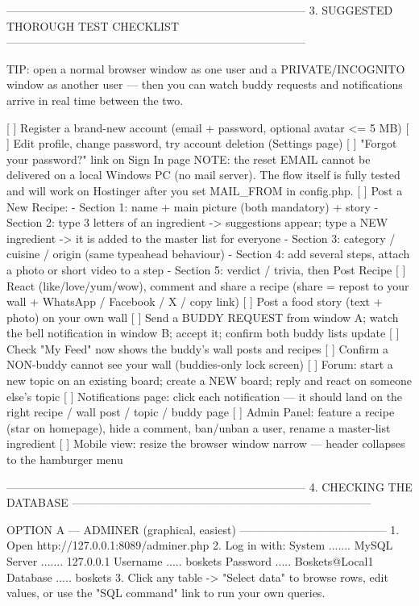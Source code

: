 --------------------------------------------------------------------------------
 3. SUGGESTED THOROUGH TEST CHECKLIST
--------------------------------------------------------------------------------

TIP: open a normal browser window as one user and a PRIVATE/INCOGNITO window
as another user — then you can watch buddy requests and notifications arrive
in real time between the two.

  [ ] Register a brand-new account (email + password, optional avatar <= 5 MB)
  [ ] Edit profile, change password, try account deletion (Settings page)
  [ ] "Forgot your password?" link on Sign In page
      NOTE: the reset EMAIL cannot be delivered on a local Windows PC
      (no mail server). The flow itself is fully tested and will work
      on Hostinger after you set MAIL_FROM in config.php.
  [ ] Post a New Recipe:
      - Section 1: name + main picture (both mandatory) + story
      - Section 2: type 3 letters of an ingredient -> suggestions appear;
        type a NEW ingredient -> it is added to the master list for everyone
      - Section 3: category / cuisine / origin (same typeahead behaviour)
      - Section 4: add several steps, attach a photo or short video to a step
      - Section 5: verdict / trivia, then Post Recipe
  [ ] React (like/love/yum/wow), comment and share a recipe
      (share = repost to your wall + WhatsApp / Facebook / X / copy link)
  [ ] Post a food story (text + photo) on your own wall
  [ ] Send a BUDDY REQUEST from window A; watch the bell notification in
      window B; accept it; confirm both buddy lists update
  [ ] Check "My Feed" now shows the buddy's wall posts and recipes
  [ ] Confirm a NON-buddy cannot see your wall (buddies-only lock screen)
  [ ] Forum: start a new topic on an existing board; create a NEW board;
      reply and react on someone else's topic
  [ ] Notifications page: click each notification — it should land on the
      right recipe / wall post / topic / buddy page
  [ ] Admin Panel: feature a recipe (star on homepage), hide a comment,
      ban/unban a user, rename a master-list ingredient
  [ ] Mobile view: resize the browser window narrow — header collapses to
      the hamburger menu


--------------------------------------------------------------------------------
 4. CHECKING THE DATABASE
--------------------------------------------------------------------------------

OPTION A — ADMINER (graphical, easiest)
---------------------------------------
  1. Open  http://127.0.0.1:8089/adminer.php
  2. Log in with:
       System ....... MySQL
       Server ....... 127.0.0.1
       Username ..... boskets
       Password ..... Boskets@Local1
       Database ..... boskets
  3. Click any table -> "Select data" to browse rows, edit values,
     or use the "SQL command" link to run your own queries.

